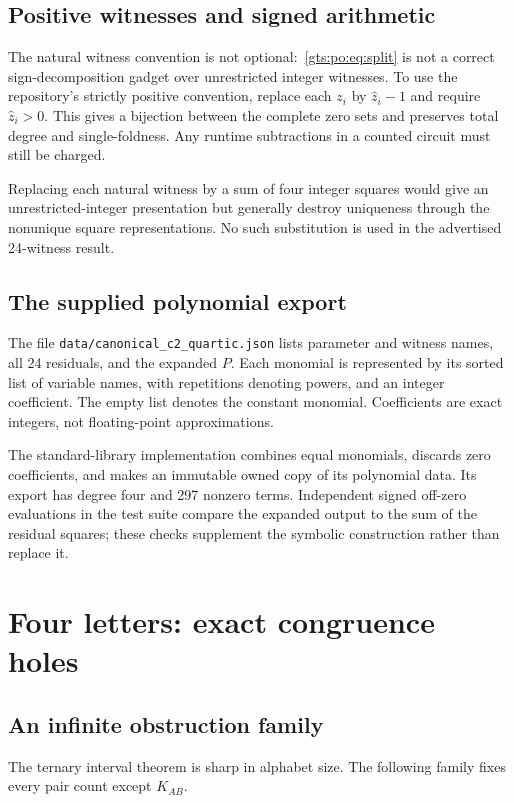 \documentclass[11pt,letterpaper]{article}
\theoremstyle{definition}
\theoremstyle{remark}
\newcommand{\code}[1]{\nolinkurl{#1}}
\begin{document}
\subsection{Positive witnesses and signed arithmetic}
The natural witness convention is not optional:~\eqref{gts:po:eq:split} is not a correct sign-decomposition gadget over unrestricted integer witnesses. To use the repository's strictly positive convention, replace each $z_i$ by $\widehat z_i-1$ and require $\widehat z_i>0$. This gives a bijection between the complete zero sets and preserves total degree and single-foldness. Any runtime subtractions in a counted circuit must still be charged.

Replacing each natural witness by a sum of four integer squares would give an unrestricted-integer presentation but generally destroy uniqueness through the nonunique square representations. No such substitution is used in the advertised 24-witness result.

\subsection{The supplied polynomial export}
The file \code{data/canonical_c2_quartic.json} lists parameter and witness names, all 24 residuals, and the expanded $P$. Each monomial is represented by its sorted list of variable names, with repetitions denoting powers, and an integer coefficient. The empty list denotes the constant monomial. Coefficients are exact integers, not floating-point approximations.

The standard-library implementation combines equal monomials, discards zero coefficients, and makes an immutable owned copy of its polynomial data. Its export has degree four and 297 nonzero terms. Independent signed off-zero evaluations in the test suite compare the expanded output to the sum of the residual squares; these checks supplement the symbolic construction rather than replace it.

\section{Four letters: exact congruence holes}
\subsection{An infinite obstruction family}
The ternary interval theorem is sharp in alphabet size. The following family fixes every pair count except $K_{AB}$.
\end{document}
